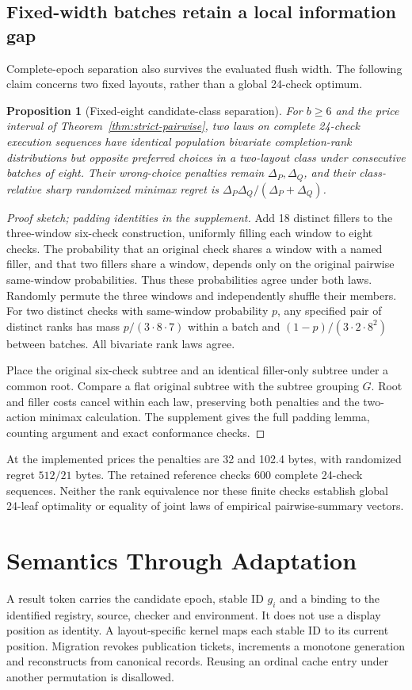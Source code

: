 \documentclass[10pt,journal,compsoc]{IEEEtran}
\newtheorem{proposition}[theorem]{Proposition}
\theoremstyle{definition}\newtheorem{definition}[theorem]{Definition}
\begin{document}
\subsection{Fixed-width batches retain a local information gap}
Complete-epoch separation also survives the evaluated flush width.
The following claim concerns two fixed layouts, rather than a global
24-check optimum.
\begin{proposition}[Fixed-eight candidate-class separation]\label{prop:fixed-eight}
For $b\ge6$ and the price interval of Theorem~\ref{thm:strict-pairwise},
two laws on complete 24-check execution sequences have identical population
bivariate completion-rank distributions but opposite preferred choices
in a two-layout class under consecutive batches of eight. Their wrong-choice
penalties remain $\Delta_P,\Delta_Q$, and their class-relative sharp
randomized minimax regret is $\Delta_P\Delta_Q/(\Delta_P+\Delta_Q)$.
\end{proposition}
\begin{proof}[Proof sketch; padding identities in the supplement]
Add 18 distinct fillers to the three-window six-check construction,
uniformly filling each window to eight checks. The probability that an
original check shares a window with a named filler, and that two fillers
share a window, depends only on the original pairwise same-window
probabilities. Thus these probabilities agree under both laws.
Randomly permute the three windows and independently shuffle their members.
For two distinct checks with same-window probability $p$, any specified
pair of distinct ranks has mass $p/(3\cdot8\cdot7)$ within a batch and
$(1-p)/(3\cdot2\cdot8^2)$ between batches. All bivariate rank laws agree.

Place the original six-check subtree and an identical filler-only subtree
under a common root. Compare a flat original subtree with the subtree
grouping $G$. Root and filler costs cancel within each law, preserving
both penalties and the two-action minimax calculation. The supplement
gives the full padding lemma, counting argument and exact conformance
checks.
\end{proof}
At the implemented prices the penalties are 32 and 102.4 bytes, with
randomized regret $512/21$ bytes. The retained reference checks 600
complete 24-check sequences. Neither the rank equivalence nor these finite
checks establish global 24-leaf optimality or equality of joint laws of
empirical pairwise-summary vectors.

\section{Semantics Through Adaptation}\label{sec:jsafety}
A result token carries the candidate epoch, stable ID $g_i$ and a binding
to the identified registry, source, checker and environment. It does not use
a display position as identity. A layout-specific kernel maps each stable
ID to its current position. Migration revokes publication tickets,
increments a monotone generation and reconstructs from canonical records.
Reusing an ordinal cache entry under another permutation is disallowed.
\end{document}

